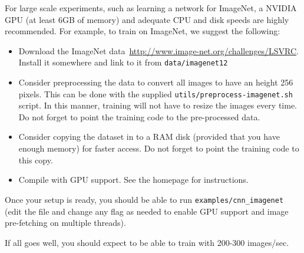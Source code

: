 For large scale experiments, such as learning a network for ImageNet, a NVIDIA GPU (at least 6GB of memory) and adequate CPU and disk speeds are highly recommended. For example, to train on ImageNet, we suggest the following:
\begin{itemize}
\item Download the ImageNet data~\url{http://www.image-net.org/challenges/LSVRC}. Install it somewhere and link to it from \verb!data/imagenet12!
\item Consider preprocessing the data to convert all images to have an height 256 pixels. This can be done with the supplied \verb!utils/preprocess-imagenet.sh! script. In this manner, training will not have to resize the images every time. Do not forget to point the training code to the pre-processed data.
\item Consider copying the dataset in to a RAM disk (provided that you have enough memory) for faster access. Do not forget to point the training code to this copy.
\item Compile \matconvnet with GPU support. See the homepage for instructions.
\end{itemize}

Once your setup is ready, you should be able to run \verb!examples/cnn_imagenet! (edit the file and change any flag as needed to enable GPU support and image pre-fetching on multiple threads).

If all goes well, you should expect to be able to train with 200-300 images/sec.